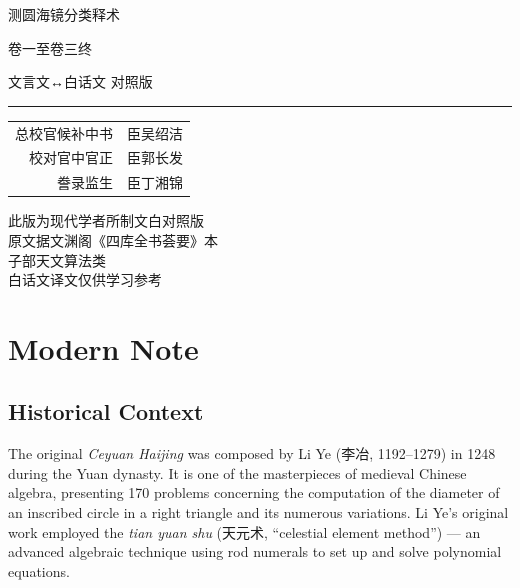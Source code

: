 \documentclass[11pt,a4paper]{article}
\newcommand{\shortline}{\noindent\rule{0.5\textwidth}{0.4pt}\par}
\newcounter{problem}[section]
\begin{document}
\thispagestyle{empty}
\begin{center}
\vspace*{3cm}
{\Large 测圆海镜分类释术}

\vspace{0.5cm}
{\large 卷一至卷三终}

\vspace{0.3cm}
{\normalsize 文言文↔白话文 对照版}

\vspace{2cm}
\shortline

\vspace{1cm}
{\normalsize
\begin{tabular}{rl}
总校官候补中书 & 臣吴绍洁 \\
校对官中官正 & 臣郭长发 \\
誊录监生 & 臣丁湘锦 \\
\end{tabular}
}

\vspace{2cm}
{\small\textcolor{notecolor}{%
此版为现代学者所制文白对照版\\
原文据文渊阁《四库全书荟要》本\\
子部天文算法类\\
白话文译文仅供学习参考
}}

\end{center}

\clearpage

\section*{Modern Note}

\subsection*{Historical Context}
The original \textit{Ceyuan Haijing} was composed by Li Ye (李冶, 1192--1279) in 1248 during the Yuan dynasty. It is one of the masterpieces of medieval Chinese algebra, presenting 170 problems concerning the computation of the diameter of an inscribed circle in a right triangle and its numerous variations. Li Ye's original work employed the \textit{tian yuan shu} (天元术, ``celestial element method'') --- an advanced algebraic technique using rod numerals to set up and solve polynomial equations.
\end{document}
